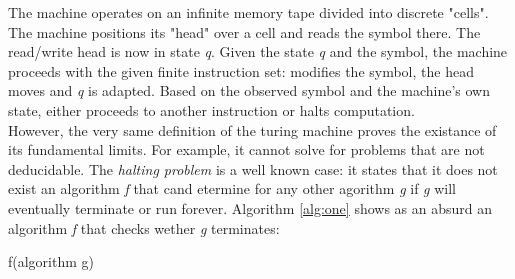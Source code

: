 The machine operates on an infinite memory tape divided into discrete "cells". The machine positions its "head" over a cell and reads the symbol there. The read/write head is now in state \textit{q}. Given the state \textit{q} and the symbol, the machine proceeds with the given finite instruction set: modifies the symbol, the head moves and \textit{q} is adapted. Based on the observed symbol and the machine's own state, either proceeds to another instruction or halts computation.\\
However, the very same definition of the turing machine proves the existance of its fundamental limits. For example, it cannot solve for problems that are not deducidable. The \textit{halting problem} is a well known case: it states that it does not exist an algorithm \textit{f} that cand etermine for any other agorithm \textit{g} if \textit{g} will eventually terminate or run forever. Algorithm \ref{alg:one} shows as an absurd an algorithm \textit{f} that checks wether \textit{g} terminates:

\begin{algorithm}
\caption{f(algorithm g)}\label{alg:one}
{
}\Else{\Return}
\end{algorithm}

	
	
	
	
	
	
	
	
	
	
	
	
	
	
	
	
	
	